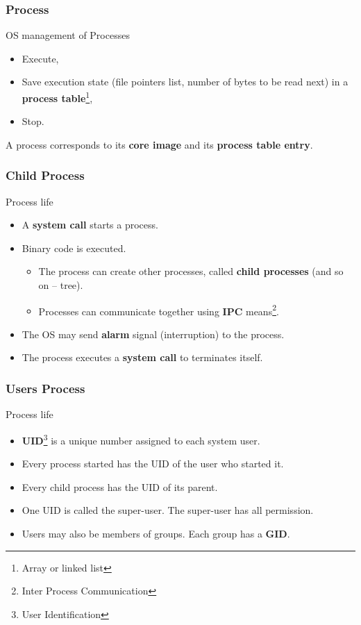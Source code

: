   \begin{frame}
    \frametitle{Process}
      \begin{block}{OS management of Processes}
        \begin{itemize}
          \item Execute,
          \item Save execution state (file pointers list, number of bytes to be read next) in a \textbf{process table}\footnote{Array or linked list},
          \item Stop.
        \end{itemize}
      \end{block}
    A process corresponds to its \textbf{core image} and its \textbf{process table entry}.
  \end{frame}
  \begin{frame}
    \frametitle{Child Process}
      \begin{block}{Process life}
        \begin{itemize}
          \item A \textbf{system call} starts a process.
          \item Binary code is executed.
            \begin{itemize}
              \item The process can create other processes, called \textbf{child processes} (and so on -- tree).
              \item Processes can communicate together using \textbf{IPC} means\footnote{Inter Process Communication}.
            \end{itemize}
          \item The OS may send \textbf{alarm} signal (interruption) to the process.
          \item The process executes a \textbf{system call} to terminates itself.
        \end{itemize}
      \end{block}
  \end{frame}
  \begin{frame}
    \frametitle{Users Process}
      \begin{block}{Process life}
        \begin{itemize}
          \item \textbf{UID}\footnote{User Identification} is a unique number assigned to each system user.
          \item Every process started has the UID of the user who started it.
          \item Every child process has the UID of its parent.
          \item One UID is called the super-user. The super-user has all permission.
          \item Users may also be members of groups. Each group has a \textbf{GID}.
        \end{itemize}
      \end{block}
  \end{frame}

